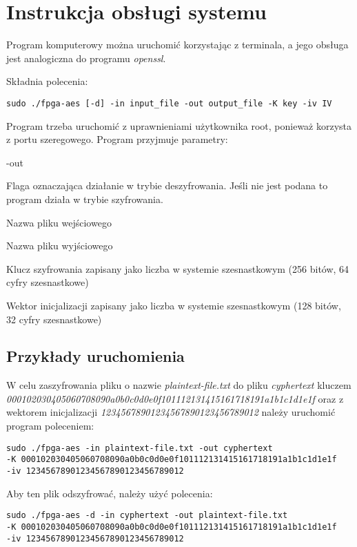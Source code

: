 \section{Instrukcja obsługi systemu}
Program komputerowy można uruchomić korzystając z terminala, a jego obsługa jest analogiczna do programu \textit{openssl}.

Składnia polecenia:
\begin{verbatim}
sudo ./fpga-aes [-d] -in input_file -out output_file -K key -iv IV
\end{verbatim}

Program trzeba uruchomić z uprawnieniami użytkownika root, ponieważ korzysta z portu szeregowego. Program przyjmuje parametry:
\begin{interface}{-out}
\item[\textbf{-d}]Flaga oznaczająca działanie w trybie deszyfrowania. Jeśli nie jest podana to program działa w trybie szyfrowania.
\item[\textbf{-in}]Nazwa pliku wejściowego
\item[\textbf{-out}]Nazwa pliku wyjściowego
\item[\textbf{-K}]Klucz szyfrowania zapisany jako liczba w systemie szesnastkowym (256 bitów, 64 cyfry szesnastkowe)
\item[\textbf{-iv}]Wektor inicjalizacji zapisany jako liczba w systemie szesnastkowym (128 bitów, 32 cyfry szesnastkowe)
\end{interface}

\subsection{Przykłady uruchomienia}
W celu zaszyfrowania pliku o nazwie \textit{plaintext-file.txt} do pliku \textit{cyphertext} kluczem \textit{000102030405060708090a0b0c0d0e0f101112131415161718191a1b1c1d1e1f} oraz z wektorem inicjalizacji \textit{12345678901234567890123456789012} należy uruchomić program poleceniem:

\begin{verbatim}
sudo ./fpga-aes -in plaintext-file.txt -out cyphertext 
-K 000102030405060708090a0b0c0d0e0f101112131415161718191a1b1c1d1e1f 
-iv 12345678901234567890123456789012
\end{verbatim}

Aby ten plik odszyfrować, należy użyć polecenia:

\begin{verbatim}
sudo ./fpga-aes -d -in cyphertext -out plaintext-file.txt 
-K 000102030405060708090a0b0c0d0e0f101112131415161718191a1b1c1d1e1f 
-iv 12345678901234567890123456789012
\end{verbatim}